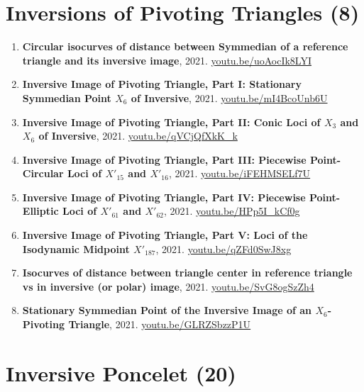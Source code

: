 \documentclass[12pt]{article}
\begin{document}
\section{Inversions of Pivoting Triangles (8)}

\begin{enumerate}[resume]
\item \textbf{Circular isocurves of distance between Symmedian of a reference triangle and its inversive image}, 2021. \href{https://youtu.be/uoAocIk8LYI}{\url{youtu.be/uoAocIk8LYI}}
\item \textbf{Inversive Image of Pivoting Triangle, Part I: Stationary Symmedian Point $X_{6}$ of Inversive}, 2021. \href{https://youtu.be/mI4BcoUnb6U}{\url{youtu.be/mI4BcoUnb6U}}
\item \textbf{Inversive Image of Pivoting Triangle, Part II: Conic Loci of $X_{3}$ and $X_{6}$ of Inversive}, 2021. \href{https://youtu.be/qVCjQfXkK_k}{\url{youtu.be/qVCjQfXkK\_k}}
\item \textbf{Inversive Image of Pivoting Triangle, Part III: Piecewise Point-Circular Loci of $X'_{15}$ and $X'_{16}$}, 2021. \href{https://youtu.be/iFEHMSELf7U}{\url{youtu.be/iFEHMSELf7U}}
\item \textbf{Inversive Image of Pivoting Triangle, Part IV: Piecewise Point-Elliptic Loci of $X'_{61}$ and $X'_{62}$}, 2021. \href{https://youtu.be/HPp5I_kCf0g}{\url{youtu.be/HPp5I\_kCf0g}}
\item \textbf{Inversive Image of Pivoting Triangle, Part V: Loci of the Isodynamic Midpoint $X'_{187}$}, 2021. \href{https://youtu.be/qZFd0SwJ8xg}{\url{youtu.be/qZFd0SwJ8xg}}
\item \textbf{Isocurves of distance between triangle center in reference triangle vs in inversive (or polar) image}, 2021. \href{https://youtu.be/SvG8ogSzZh4}{\url{youtu.be/SvG8ogSzZh4}}
\item \textbf{Stationary Symmedian Point of the Inversive Image of an $X_{6}$-Pivoting Triangle}, 2021. \href{https://youtu.be/GLRZSbzzP1U}{\url{youtu.be/GLRZSbzzP1U}}
\end{enumerate}

\section{Inversive Poncelet (20)}
\end{document}

